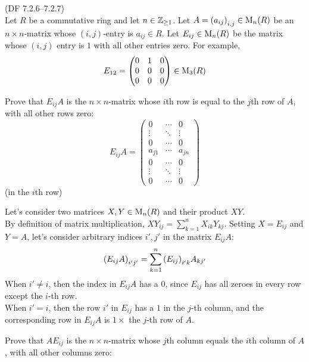 \begin{problem}{(\textsf{DF 7.2.6--7.2.7})} \\
  Let $R$ be a commutative ring and let $n \in \mathbb{Z}_{\geq 1}$.
  Let $A={(a_{ij})}_{i,j} \in \operatorname{M}_n(R)$ be an $n \times n$-matrix
  whose $(i,j)$-entry is $a_{ij} \in R$.
  Let $E_{ij} \in \operatorname{M}_n(R)$ be the matrix whose $(i,j)$ entry is $1$ with all other entries zero.
  For example,
  \[E_{12}=\begin{pmatrix} 0 & 1 & 0 \\ 0 & 0 & 0 \\ 0 & 0 & 0\end{pmatrix} \in \operatorname{M}_3(R)\]  
  \begin{enumalph}
    \item Prove that $E_{ij}A$ is the $n \times n$-matrix whose $i$th row
      is equal to the $j$th row of $A$, with all other rows zero:
      \[
        E_{ij}A=\begin{pmatrix}
        0 & \cdots & 0 \\
        \vdots & \ddots & \vdots \\
        0 & \cdots & 0 \\
        a_{j1} & \cdots & a_{jn} \\
        0 & \cdots & 0 \\
        \vdots & \ddots & \vdots \\
        0 & \cdots & 0
        \end{pmatrix}
      \] (in the $i$th row)
      \begin{Answer}
        Let's consider two matrices $X, Y \in \operatorname{M}_n(R)$ and their product $XY$. \\
        By definition of matrix multiplication, ${XY}_{ij} = \sum_{k=1}^n X_{ik}Y_{kj}$.
        Setting $X=E_{ij}$ and $Y=A$, let's consider arbitrary indices $i', j'$ in the
        matrix $E_{ij}A$:
        \[
          {(E_{ij}A)}_{i'j'} = \sum_{k=1}^n {(E_{ij})}_{i'k}A_{kj'} \\
        \]
        When $i' \neq i$, then the index in $E_{ij}A$ has a $0$,
        since $E_{ij}$ has all zeroes in every row except the $i$-th row. \\
        When $i' = i$, then the row $i'$ in $E_{ij}$ has a $1$ in the $j$-th column,
        and the corresponding row in $E_{ij}A$ is $1 \times$ the $j$-th row of $A$.
      \end{Answer}
    \newpage
    \item Prove that $AE_{ij}$ is the $n \times n$-matrix whose $j$th column
      equals the $i$th column of $A$, with all other columns zero:

\end{enumalph}
\end{problem}
